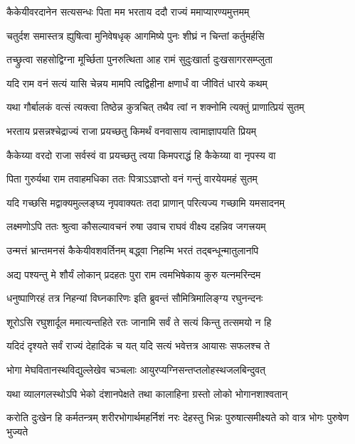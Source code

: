 \twolineshloka
{कैकेयीवरदानेन सत्यसन्धः पिता मम}
{भरताय ददौ राज्यं ममाप्यारण्यमुत्तमम्} %

\twolineshloka
{चतुर्दश समास्तत्र ह्युषित्वा मुनिवेषधृक्}
{आगमिष्ये पुनः शीघ्रं न चिन्तां कर्तुमर्हसि} %

\twolineshloka
{तच्छ्रुत्वा सहसोद्विग्ना मूर्च्छिता पुनरुत्थिता}
{आह रामं सुदुःखार्ता दुःखसागरसम्प्लुता} %

\twolineshloka
{यदि राम वनं सत्यं यासि चेन्नय मामपि}
{त्वद्विहीना क्षणार्धं वा जीवितं धारये कथम्} %

\twolineshloka
{यथा गौर्बालकं वत्सं त्यक्त्वा तिष्ठेन्न कुत्रचित्}
{तथैव त्वां न शक्नोमि त्यक्तुं प्राणात्प्रियं सुतम्} %

\twolineshloka
{भरताय प्रसन्नश्चेद्राज्यं राजा प्रयच्छतु}
{किमर्थं वनवासाय त्वामाज्ञापयति प्रियम्} %

\twolineshloka
{कैकेय्या वरदो राजा सर्वस्वं वा प्रयच्छतु}
{त्वया किमपराद्धं हि कैकेय्या वा नृपस्य वा} %

\twolineshloka
{पिता गुरुर्यथा राम तवाहमधिका ततः}
{पित्राऽऽज्ञप्तो वनं गन्तुं वारयेयमहं सुतम्} %

\twolineshloka
{यदि गच्छसि मद्वाक्यमुल्लङ्घ्य नृपवाक्यतः}
{तदा प्राणान् परित्यज्य गच्छामि यमसादनम्} %

\twolineshloka
{लक्ष्मणोऽपि ततः श्रुत्वा कौसल्यावचनं रुषा}
{उवाच राघवं वीक्ष्य दहन्निव जगत्त्रयम्} %

\twolineshloka
{उन्मत्तं भ्रान्तमनसं कैकेयीवशवर्तिनम्}
{बद्ध्वा निहन्मि भरतं तद्बन्धून्मातुलानपि} %

\twolineshloka
{अद्य पश्यन्तु मे शौर्यं लोकान् प्रदहतः पुरा}
{राम त्वमभिषेकाय कुरु यत्नमरिन्दम} %

\twolineshloka
{धनुष्पाणिरहं तत्र निहन्यां विघ्नकारिणः}
{इति ब्रुवन्तं सौमित्रिमालिङ्ग्य रघुनन्दनः} %

\twolineshloka
{शूरोऽसि रघुशार्दूल ममात्यन्तहिते रतः}
{जानामि सर्वं ते सत्यं किन्तु तत्समयो न हि} %

\twolineshloka
{यदिदं दृश्यते सर्वं राज्यं देहादिकं च यत्}
{यदि सत्यं भवेत्तत्र आयासः सफलश्च ते} %

\twolineshloka
{भोगा मेघवितानस्थविद्युल्लेखेव चञ्चलाः}
{आयुरप्यग्निसन्तप्तलोहस्थजलबिन्दुवत्} %

\twolineshloka
{यथा व्यालगलस्थोऽपि भेको दंशानपेक्षते}
{तथा कालाहिना ग्रस्तो लोको भोगानशाश्वतान्} %

\fourlineindentedshloka
{करोति दुःखेन हि कर्मतन्त्रम्}
{शरीरभोगार्थमहर्निशं नरः}
{देहस्तु भिन्नः पुरुषात्समीक्ष्यते}
{को वात्र भोगः पुरुषेण भुज्यते} %


